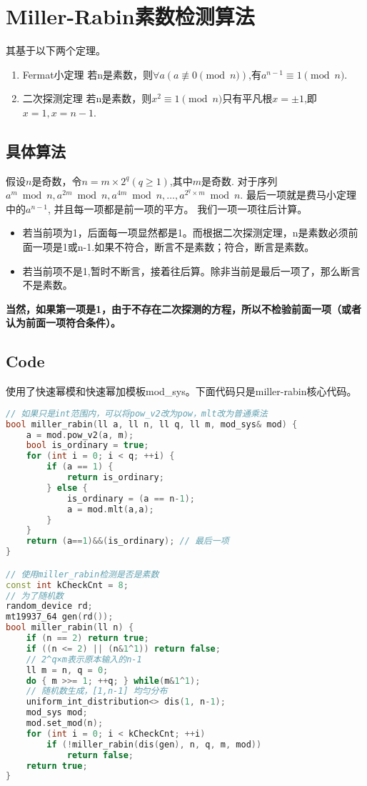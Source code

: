 \section{Miller-Rabin素数检测算法}
其基于以下两个定理。
\begin{enumerate}
    \item Fermat小定理 若n是素数，则$\forall a(a \not\equiv 0 \pmod{n})$,有$a^{n-1} \equiv 1 \pmod{n}$.
    \item 二次探测定理 若n是素数，则$x^2 \equiv 1 \pmod{n}$只有平凡根$x=\pm1$,即$x=1,x=n-1$.
\end{enumerate}
\subsection{具体算法}
假设$n$是奇数，令$n=m \times 2^q (q \geq 1)$,其中$m$是奇数.
对于序列$a^m \bmod n, a^{2m} \bmod n, a^{4m} \bmod n,\ldots,a^{2^q \times m} \bmod n$.
最后一项就是费马小定理中的$a^{n-1}$, 并且每一项都是前一项的平方。
我们一项一项往后计算。
\begin{itemize}
    \item 若当前项为1，后面每一项显然都是1。而根据二次探测定理，n是素数必须前面一项是1或n-1.如果不符合，断言不是素数；符合，断言是素数。
    \item 若当前项不是1,暂时不断言，接着往后算。除非当前是最后一项了，那么断言不是素数。
\end{itemize}
\textbf{当然，如果第一项是1，由于不存在二次探测的方程，所以不检验前面一项（或者认为前面一项符合条件）。}
\subsection{Code}
使用了快速幂模和快速幂加模板mod\_sys。下面代码只是miller-rabin核心代码。
\begin{lstlisting}[language={c++}]
// 如果只是int范围内，可以将pow_v2改为pow，mlt改为普通乘法
bool miller_rabin(ll a, ll n, ll q, ll m, mod_sys& mod) {
    a = mod.pow_v2(a, m);
    bool is_ordinary = true;
    for (int i = 0; i < q; ++i) {
        if (a == 1) {
            return is_ordinary;
        } else {
            is_ordinary = (a == n-1);
            a = mod.mlt(a,a);
        }
    }
    return (a==1)&&(is_ordinary); // 最后一项
}

// 使用miller_rabin检测是否是素数
const int kCheckCnt = 8;
// 为了随机数
random_device rd;
mt19937_64 gen(rd());
bool miller_rabin(ll n) {
    if (n == 2) return true;
    if ((n <= 2) || (n&1^1)) return false;
    // 2^q×m表示原本输入的n-1
    ll m = n, q = 0;
    do { m >>= 1; ++q; } while(m&1^1);
    // 随机数生成，[1,n-1] 均匀分布
    uniform_int_distribution<> dis(1, n-1);
    mod_sys mod;
    mod.set_mod(n);
    for (int i = 0; i < kCheckCnt; ++i)
        if (!miller_rabin(dis(gen), n, q, m, mod))
            return false;
    return true;
}
\end{lstlisting}